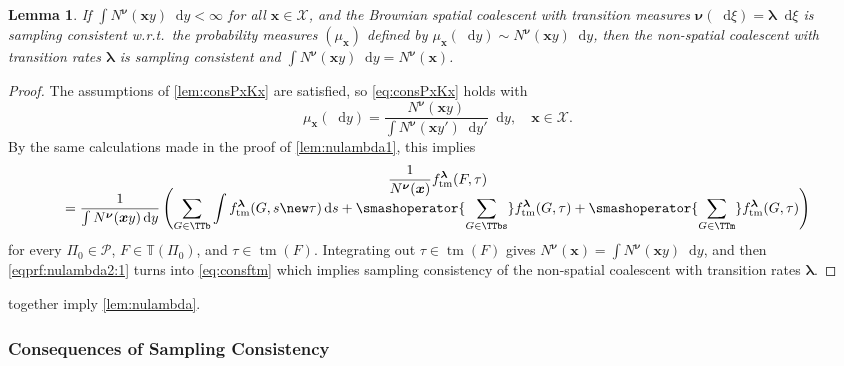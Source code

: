 \documentclass[reqno,draft]{amsart}
\numberwithin{equation}{section}
\theoremstyle{plain}
\newtheorem{lemma}[theorem]{Lemma}
\theoremstyle{remark}
\newcommand*\diff{\mathop{}\!\mathrm{d}}
\newcommand{\fpart}{\Pi} %
\DeclareMathOperator{\dct}{tm}
\newcommand{\ftm}{f_\mathrm{tm}^{\boldsymbol \lambda}}
\begin{document}
\begin{lemma}\label{lem:nulambda2}
    If $\int N^{\boldsymbol \nu}(\boldsymbol xy) \diff y < \infty$ for all $\boldsymbol x\in \mathcal{X}$, and the Brownian spatial coalescent with transition measures $\boldsymbol \nu(\diff \xi) = \boldsymbol \lambda \diff \xi$ is sampling consistent w.r.t.\ the probability measures $(\mu_{\boldsymbol x})$ defined by $\mu_{\boldsymbol x}(\diff y) \sim N^{\boldsymbol \nu}(\boldsymbol xy) \diff y$, then the non-spatial coalescent with transition rates $\boldsymbol \lambda$ is sampling consistent and $\int N^{\boldsymbol\nu}(\boldsymbol xy) \diff y = N^{\boldsymbol\nu}(\boldsymbol x)$.
\end{lemma}
\begin{proof}
    The assumptions of \cref{lem:consPxKx} are satisfied, so \cref{eq:consPxKx} holds with \[
        \mu_{\boldsymbol x}(\diff y) = \frac{N^{\boldsymbol\nu}(\boldsymbol xy)}{\int N^{\boldsymbol\nu}(\boldsymbol xy')\diff y'}\diff y,\quad \boldsymbol x\in \mathcal{X}.
    \] By the same calculations made in the proof of \cref{lem:nulambda1}, this implies
    \begin{multline}\label{eqprf:nulambda2:1}
        \frac{1}{N^{\boldsymbol\nu}(\boldsymbol x)} \ftm(F,\tau) \\[-10pt]
        = \frac{1}{\int N^{\boldsymbol\nu}(\boldsymbol xy) \diff y} \left(\sum_{G\in \TTb} \int \ftm(G,s\new\tau) \diff s + \smashoperator{\sum_{G\in \TTbs}} \ftm(G,\tau) + \smashoperator{\sum_{G\in \TTm}} \ftm(G,\tau)\right)
    \end{multline}
    for every $\fpart_0\in \mathcal{P}$, $F\in \mathbb{T}(\fpart_0)$, and $\tau\in \dct(F)$. Integrating out $\tau\in \dct(F)$ gives $N^{\boldsymbol\nu}(\boldsymbol x) = \int N^{\boldsymbol\nu}(\boldsymbol xy) \diff y$, and then \cref{eqprf:nulambda2:1} turns into \cref{eq:consftm} which implies sampling consistency of the non-spatial coalescent with transition rates $\boldsymbol \lambda$.
\end{proof}

 together imply \cref{lem:nulambda}.

\subsubsection{Consequences of Sampling Consistency}\label{sec:consequences}
\end{document}
